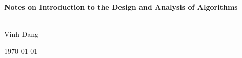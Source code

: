 \begin{titlepage}
	\vbox{ }
	
	\vbox{ }
	
	\begin{center}
		
		\vbox{ }
		\HRule \\[0.4cm]
		{ \huge \bfseries Notes on Introduction to the Design and Analysis of Algorithms}\\[0.4cm]
		\HRule \\[1.5cm]

			\begin{center} \large
				Vinh Dang
			\end{center}

		
		\vfill
		{\large \today}
	\end{center}
\end{titlepage}